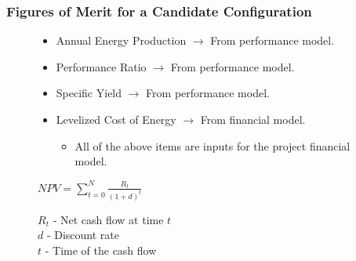 \documentclass[aspectratio=169]{beamer}
\begin{document}
\begin{frame}
  \frametitle{Figures of Merit for a Candidate Configuration}
  \begin{figure}

  \begin{itemize}
  \item Annual Energy Production $\rightarrow$ From performance model.
  \item Performance Ratio $\rightarrow$ From performance model.
  \item Specific Yield $\rightarrow$ From performance model.
  \item Levelized Cost of Energy $\rightarrow$ From financial model.
    \begin{itemize}
    \item All of the above items are inputs for the project financial model.
    \end{itemize}
  \end{itemize}
    
    \center
    $NPV=\displaystyle\sum\limits_{t=0}^N\frac{R_{t}}{(1+d)^t}$
  \end{figure}
  \begin{figure}
    \raggedright
    \scriptsize
    $R_{t}$ - Net cash flow at time $t$\\
    $d$ - Discount rate\\
    $t$ - Time of the cash flow
  \end{figure}
  
\end{frame}
\end{document}
